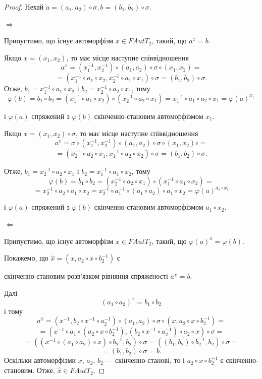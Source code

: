 \documentclass[a4paper,12pt]{article} \usepackage{a4wide}
\numberwithin{equation}{subsection}
\begin{document}
\begin{proof}
 Нехай $a = (a_1,a_2)\circ\sigma, b = (b_1,b_2)\circ\sigma$.

$\Rightarrow$

 Припустимо, що існує автоморфізм $x\in FAutT_2$, такий, що $a^x = b$.

Якщо $x = (x_1, x_2)$, то має місце наступне співвідношення
$$a^x = (x_1^{-1},x_2^{-1})\circ (a_1,a_2)\circ\sigma \circ (x_1,x_2) =$$
$$= (x_1^{-1}\circ a_1 \circ x_2,x_2^{-1}\circ a_1 \circ x_1 )\circ\sigma  = (b_1,b_2)\circ\sigma.$$
Отже, $b_1 = x_1^{-1}\circ a_1 \circ x_2 $ і $b_2 = x_2^{-1}\circ a_2 \circ x_1 $, тому
$$\varphi(b) = b_1 \circ b_2 = (x_1^{-1}\circ a_1 \circ x_2)\circ (x_2^{-1}\circ a_2 \circ x_1  ) = x_1^{-1}\circ a_1 \circ a_2 \circ x_1 = \varphi(a)^{x_1} $$

і $\varphi(a)$ спряжений з  $\varphi(b)$ скінченно-становим автоморфізмом $x_1$.

Якщо $x = (x_1, x_2)\circ \sigma$, то має місце наступне співвідношення
$$a^x = \sigma \circ (x_1^{-1},x_2^{-1})\circ (a_1,a_2)\circ\sigma \circ (x_1,x_2) \circ  =$$
$$= (x_2^{-1}\circ a_2 \circ x_1,x_1^{-1}\circ a_2 \circ x_2 )\circ\sigma  = (b_1,b_2)\circ\sigma.$$

Отже, $b_1 = x_2^{-1}\circ a_2 \circ x_1 $ і $b_2 = x_1^{-1}\circ a_1 \circ x_2 $, тому
$$\varphi(b) = b_1 \circ b_2 = (x_2^{-1}\circ a_2 \circ x_1)\circ (x_1^{-1}\circ a_1 \circ x_2  ) =$$ $$= x_2^{-1}\circ a_2 \circ a_1 \circ x_2 = x_2^{-1} \circ a_1^{-1} \circ (a_1\circ a_2) \circ a_1 \circ x_2= \varphi(a)^{a_1\circ x_1} $$

і $\varphi(a)$ спряжений з  $\varphi(b)$ скінченно-становим автоморфізмом $a_1\circ x_2$.


$\Leftarrow$

 Припустимо, що існує автоморфізм $x\in FAutT_2$, такий, що $\varphi(a)^x = \varphi(b)$.

  Покажемо, що $\hat{x} = (x, a_2\circ x \circ b_2^{-1})$ є

  скінченно-становим розв'язком рівняння спряженості $a^\chi = b$.

Далі
$$(a_1\circ a_2)^x = b_1\circ b_2$$
і тому %
$$a^{\hat{x}} = (x^{-1}, b_2\circ x^{-1} \circ a_2^{-1}) \circ (a_1,a_2)\circ \sigma \circ (x, a_2\circ x \circ b_2^{-1}) =$$
$$= (x^{-1}\circ a_1 \circ (a_2\circ x \circ b_2^{-1}),(b_2\circ x^{-1} \circ a_2^{-1})\circ a_2 \circ x )\circ \sigma= $$
$$= ((x^{-1}\circ (a_1 \circ a_2)\circ x) \circ b_2^{-1},b_2)\circ \sigma= ((b_1,b_2) \circ b_2^{-1},b_2)\circ \sigma =$$ $$ =(b_1,b_2)\circ \sigma = b. $$
Оскільки автоморфізми $x$, $a_2$, $b_2$ --- скінченно-станові, то і
$a_2\circ x \circ b_2^{-1}$ є скінченно-становим. Отже, $\hat{x}\in
FAutT_2$.
\end{proof}
\end{document}
